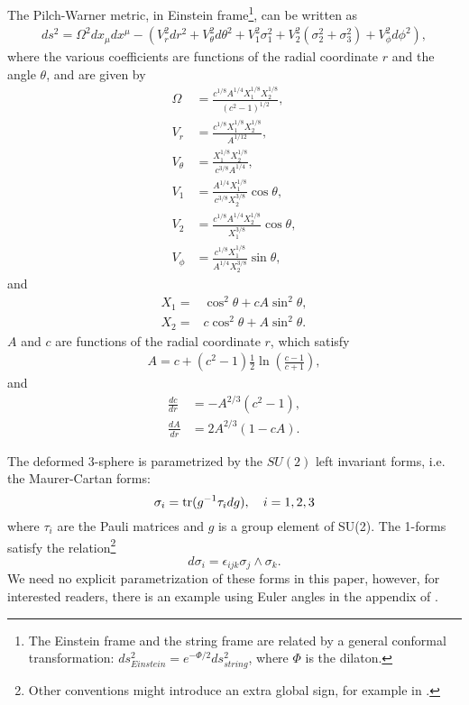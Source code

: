 The Pilch-Warner metric, in Einstein frame\footnote{The Einstein frame and the string frame are related by a general conformal transformation: $ds^2_{Einstein} = e^{-\Phi / 2} ds^2_{string}$, where $\Phi$ is the dilaton.}, can be written as \cite{Pilch:2003jg}
\begin{align}\label{eq:PWmetric}
ds^2 =
\Omega^2 dx_\mu dx^\mu -\left(
V_r^2 dr^2 + V_\theta^2 d\theta^2 + V_1^2 \sigma_1^2 + V_2^2 (\sigma_2^2 + \sigma_3^2) + V_\phi^2 d\phi^2\right),
\end{align}
where the various coefficients are functions of the radial coordinate $r$ and the angle $\theta$, and are given by
\begin{align}\label{eq:PWvielbeins}
\Omega &= \frac{c^{1/8} A^{1/4} X_1^{1/8} X_2^{1/8}}{(c^2 - 1)^{1/2}},\nonumber\\
V_r &= \frac{c^{1/8}X_1^{1/8} X_2^{1/8}}{A^{1/12}},\nonumber\\
V_\theta &= \frac{X_1^{1/8} X_2^{1/8}}{c^{3/8}A^{1/4}},\nonumber\\
V_1 &= \frac{A^{1/4}X_1^{1/8} }{c^{3/8}X_2^{3/8}} \cos\theta,\nonumber\\
V_2 &= \frac{c^{1/8}A^{1/4}X_2^{1/8} }{X_1^{3/8}} \cos\theta, \nonumber\\
V_\phi &= \frac{c^{1/8}X_1^{1/8} }{A^{1/4}X_2^{3/8}} \sin\theta,
\end{align}
and
\begin{align}
X_1 = & \cos^2\theta + cA  \sin^2\theta,\nonumber\\
X_2 = & c \cos^2\theta + A  \sin^2\theta.
\end{align}
$A$ and $c$ are functions of the radial coordinate $r$, which satisfy
\begin{align}
A = c+(c^2 -1)\frac{1}{2}\ln\left(\frac{c-1}{c+1}\right),
\end{align}
and
\begin{align}
\label{dcdr} \frac{dc}{dr} &= - A^{2/3}(c^2 - 1),\\ 
\label{dAdr} \frac{dA}{dr} &= 2 A^{2/3}\left(1 - c A\right).
\end{align}

The deformed 3-sphere is parametrized by the $SU(2)$ left invariant forms, i.e. the Maurer-Cartan forms:
\begin{equation}
\sigma_i = \mathop{\mathrm{tr}}(g^{-1}\tau_i d g), \quad i = 1,2,3
\end{equation}
where $\tau_i$ are the Pauli matrices and $g$ is a group element of SU(2). The 1-forms satisfy the relation\footnote{Other conventions might introduce an extra global sign, for example in \cite{Buchel:2000cn}.}
\begin{equation}
 d\sigma_i  = \epsilon_{i j k} \sigma_j \wedge \sigma_k.
\end{equation}
We need no explicit parametrization of these forms in this paper, however, for interested readers, there is an example using Euler angles in the appendix of \cite{Chen-Lin:2015xlh}.



